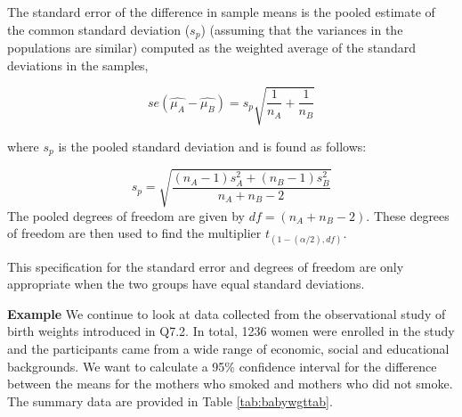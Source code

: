 \documentclass[
  oneside]{krantz}
\begin{document}
The standard error of the difference in sample means is the pooled estimate of the common standard deviation (\(s_p\)) (assuming that the variances in the populations are similar) computed as the weighted average of the standard deviations in the samples,

\[se(\hat{\mu_A} - \hat{\mu_B})=s_p\sqrt{\frac{1}{n_A} + \frac{1}{n_B}}\]

where \(s_p\) is the pooled standard deviation and is found as follows:

\[ s_p = \sqrt{\frac{(n_A-1)s_A^2 + (n_B-1)s_B^2}{n_A + n_B -2}}\]
The pooled degrees of freedom are given by \(df=(n_A + n_B - 2)\). These degrees of freedom are then used to find the multiplier \(t_{(1-(\alpha/2), df)}\).

This specification for the standard error and degrees of freedom are only appropriate when the two groups have equal standard deviations.

\textbf{Example} We continue to look at data collected from the observational study of birth weights introduced in Q7.2. In total, 1236 women were enrolled in the study and the participants came from a wide range of economic, social and educational backgrounds. We want to calculate a 95\% confidence interval for the difference between the means for the mothers who smoked and mothers who did not smoke. The summary data are provided in Table \ref{tab:babywgttab}.
\end{document}
